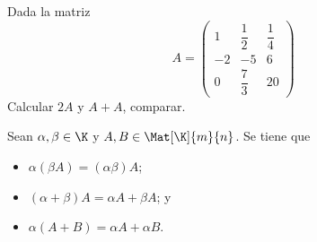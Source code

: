 \documentclass[compacto,10pt]{pubciencias-notas}
\begin{document}
\begin{ejer}\hspace{0pt} Dada la matriz 
\[
    A = 
    \begin{pmatrix}
    1&\dfrac{1}{2}&\dfrac{1}{4}\\
    -2&-5&6\\
    0&\dfrac{7}{3}&20
    \end{pmatrix}
\]
Calcular   $2A$ y $A + A$, comparar.
\end{ejer}

\begin{teo}\label{Teo:Sem01Cla01PropMult}
    Sean $\alpha,\beta \in \K$ y $A,B\in\Mat[\K]{m}{n}$. Se tiene que
    \begin{itemize}
    \item[$a)$] 
        $\alpha(\beta A) = (\alpha\beta)A$;
    \item[$b)$] 
        $(\alpha+\beta)A = \alpha A + \beta A$; y
    \item[$c)$] 
        $\alpha(A+B) = \alpha A + \alpha B$.
    \end{itemize}
\end{teo}

\end{document}
